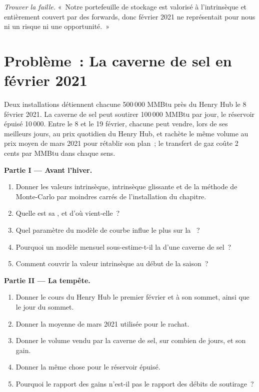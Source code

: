 \begin{exercise}[$\star\star\star$]\label{exo:rc:commodity-and-energy-derivatives:8}
\emph{Trouver la faille.} «~Notre portefeuille de stockage est valorisé à l'intrinsèque et entièrement couvert par des
forwards, donc février 2021 ne représentait pour nous ni un risque ni une opportunité.~»
\end{exercise}

\section{Problème~: La caverne de sel en février 2021}

\begin{problem}\label{pb:rc:commodity-and-energy-derivatives:1}
Deux installations détiennent chacune 500\,000 MMBtu près du Henry Hub le 8 février 2021. La caverne de sel
peut soutirer 100\,000 MMBtu par jour, le réservoir épuisé 10\,000. Entre le 8 et le 19 février,
chacune peut vendre, lors de ses meilleurs jours, au prix quotidien du Henry Hub, et rachète le même volume
au prix moyen de mars 2021 pour rétablir son plan~; le transfert de gaz coûte 2 cents par MMBtu dans chaque sens.

\medskip\noindent\textbf{Partie I --- Avant l'hiver.}
\begin{enumerate}
\item Donner les valeurs intrinsèque, intrinsèque glissante et de la méthode de Monte-Carlo
par moindres carrés de l'installation du chapitre.
\item Quelle est sa , et d'où vient-elle~?
\item Quel paramètre du modèle de courbe influe le plus sur la ~?
\item Pourquoi un modèle mensuel sous-estime-t-il la  d'une caverne de sel~?
\item Comment couvrir la valeur intrinsèque au début de la saison~?
\end{enumerate}

\medskip\noindent\textbf{Partie II --- La tempête.}
\begin{enumerate}[resume]
\item Donner le cours du Henry Hub le premier février et à son sommet, ainsi que le jour du sommet.
\item Donner la moyenne de mars 2021 utilisée pour le rachat.
\item Donner le volume vendu par la caverne de sel, sur combien de jours, et son gain.
\item Donner la même chose pour le réservoir épuisé.
\item Pourquoi le rapport des gains n'est-il pas le rapport des débits de soutirage~?
\end{enumerate}


\end{problem}
